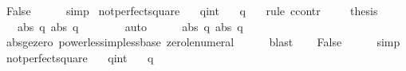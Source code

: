 \begin{isabellebody}
\ False\isanewline
\ \ \ \ \isamarkupfalse%
\ simp\isanewline
{}\isamarkupfalse%
%
\endisatagproof
{\isafoldproof}%
%
\isadelimproof
\isanewline
%
\endisadelimproof
\isanewline
{}\isamarkupfalse%
\ not{\isacharunderscore}perfect{\isacharunderscore}square{\isacharunderscore}{}{\isacharcolon}\isanewline
\ \ \ q{\isacharcolon}{\isacharcolon}int\isanewline
\ \ \ {\isachardoublequoteopen}q{\isacharcircum}{}\ {\isasymnoteq}\ {}{\isachardoublequoteclose}\isanewline
%
\isadelimproof
%
\endisadelimproof
%
\isatagproof
{}\isamarkupfalse%
\ {\isacharparenleft}rule\ ccontr{\isacharparenright}\isanewline
\ \ \isamarkupfalse%
\ {\isachardoublequoteopen}{\isasymnot}\ {\isacharquery}thesis{\isachardoublequoteclose}\isanewline
\ \ \isamarkupfalse%
\ {\isachardoublequoteopen}{}{\isacharcircum}{}\ {\isacharless}\ {\isacharparenleft}abs\ q{\isacharparenright}{\isacharcircum}{}{\isachardoublequoteclose}\ {\isachardoublequoteopen}{\isacharparenleft}abs\ q{\isacharparenright}{\isacharcircum}{}\ {\isacharless}\ {}{\isacharcircum}{}{\isachardoublequoteclose}\isanewline
\ \ \ \ \isamarkupfalse%
\ auto\isanewline
\ \ \isamarkupfalse%
\ {\isachardoublequoteopen}{}\ {\isacharless}\ abs\ q{\isachardoublequoteclose}\ {\isachardoublequoteopen}abs\ q\ {\isacharless}\ {}{\isachardoublequoteclose}\isanewline
\ \ \ \ \isamarkupfalse%
\ abs{\isacharunderscore}ge{\isacharunderscore}zero\ power{\isacharunderscore}less{\isacharunderscore}imp{\isacharunderscore}less{\isacharunderscore}base\ zero{\isacharunderscore}le{\isacharunderscore}numeral\isanewline
\ \ \ \ \isamarkupfalse%
\ blast{\isacharplus}\isanewline
\ \ \isamarkupfalse%
\ False\isanewline
\ \ \ \ \isamarkupfalse%
\ simp\isanewline
{}\isamarkupfalse%
%
\endisatagproof
{\isafoldproof}%
%
\isadelimproof
\isanewline
%
\endisadelimproof
\isanewline
{}\isamarkupfalse%
\ not{\isacharunderscore}perfect{\isacharunderscore}square{\isacharunderscore}{}{\isacharcolon}\isanewline
\ \ \ q{\isacharcolon}{\isacharcolon}int\isanewline
\ \ \ {\isachardoublequoteopen}q{\isacharcircum}{}\ {\isasymnoteq}\ {}{\isachardoublequoteclose}\isanewline
%
\isadelimproof
%
\endisadelimproof
%
\isatagproof

\end{isabellebody}

